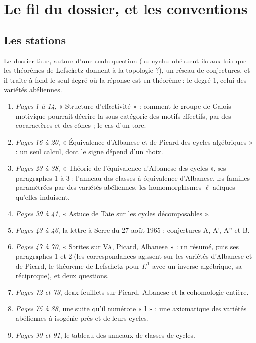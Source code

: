 \documentclass[11pt,a4paper]{article}
\begin{document}
\section*{Le fil du dossier, et les conventions}

\subsection*{Les stations}

Le dossier tisse, autour d'une seule
question (les cycles obéissent-ils aux lois que les théorèmes de Lefschetz
donnent à la topologie ?), un réseau de conjectures, et il traite à fond le
seul degré où la réponse est un théorème : le degré 1, celui des variétés
abéliennes.

\begin{enumerate}
  \item \emph{Pages 1 à 14}, « Structure d'effectivité » : comment le groupe
  de Galois motivique pourrait décrire la sous-catégorie des motifs effectifs,
  par des cocaractères et des cônes ; le cas d'un tore.
  \item \emph{Pages 16 à 20}, « Équivalence d'Albanese et de Picard des cycles
  algébriques » : un seul calcul, dont le signe dépend d'un choix.
  \item \emph{Pages 23 à 38}, « Théorie de l'équivalence d'Albanese des
  cycles », ses paragraphes 1 à 3 : l'anneau des classes à équivalence
  d'Albanese, les familles paramétrées par des variétés abéliennes, les
  homomorphismes $\ell$-adiques qu'elles induisent.
  \item \emph{Pages 39 à 41}, « Astuce de Tate sur les cycles décomposables ».
  \item \emph{Pages 43 à 46}, la lettre à Serre du 27 août 1965 :
  conjectures A, A', A'' et B.
  \item \emph{Pages 47 à 70}, « Sorites sur VA, Picard, Albanese » : un résumé,
  puis ses paragraphes 1 et 2 (les correspondances agissent sur les
  variétés d'Albanese et de Picard, le théorème de Lefschetz pour $H^{1}$ avec
  un inverse algébrique, sa réciproque), et deux questions.
  \item \emph{Pages 72 et 73}, deux feuillets sur Picard, Albanese et la
  cohomologie entière.
  \item \emph{Pages 75 à 88}, une suite qu'il numérote « I » : une
  axiomatique des variétés abéliennes à isogénie près et de leurs cycles.
  \item \emph{Pages 90 et 91}, le tableau des anneaux de classes de cycles.

\end{enumerate}
\end{document}
